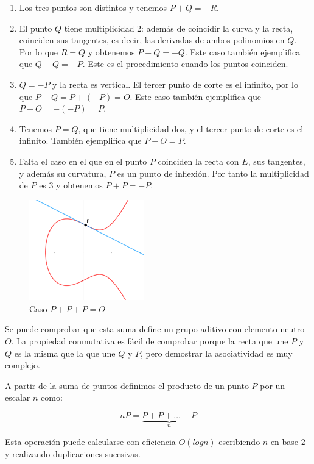 \documentclass{article}
\begin{document}
\begin{enumerate}
\item Los tres puntos son distintos y tenemos $P+Q=-R$.

\item El punto $Q$ tiene multiplicidad 2: además de coincidir la curva
y la recta, coinciden sus tangentes, es decir, las derivadas de ambos
polinomios en $Q$. Por lo que $R=Q$ y obtenemos $P+Q=-Q$. Este caso
también ejemplifica que $Q+Q=-P$. Este es el procedimiento cuando los
puntos coinciden.

\item $Q=-P$ y la recta es vertical. El tercer punto de corte es el
infinito, por lo que $P+Q=P+(-P)=O$. Este caso también ejemplifica que
$P+O=-(-P)=P$.

\item Tenemos $P=Q$, que tiene multiplicidad dos, y el tercer punto de
corte es el infinito. También ejemplifica que $P+O=P$.

\item Falta el caso en el que en el punto $P$ coinciden la recta con
$E$, sus tangentes, y además su curvatura, $P$ es un punto de
inflexión. Por tanto la multiplicidad de $P$ es $3$ y obtenemos
$P+P=-P$.
\end{enumerate}

\begin{figure}[H]
  \centering
  \includegraphics[width=50mm]{imagenes/suma3P}
  \caption{Caso $P+P+P = O$}
\end{figure}

Se puede comprobar que esta suma define un grupo aditivo con elemento
neutro $O$. La propiedad conmutativa es fácil de comprobar porque la
recta que une $P$ y $Q$ es la misma que la que une $Q$ y $P$, pero
demostrar la asociatividad es muy complejo.

A partir de la suma de puntos definimos el producto de un punto $P$
por un escalar $n$ como:

$$nP = \underbrace{P + P + \ldots + P}_{{n}}$$

Esta operación puede calcularse con eficiencia $O(log n)$ escribiendo
$n$ en base $2$ y realizando duplicaciones sucesivas.
\end{document}
